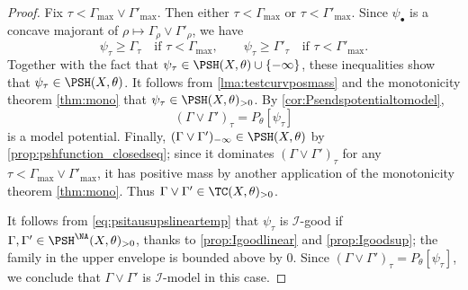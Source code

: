 \begin{proof}
    Fix $\tau<\Gamma_{\max}\lor \Gamma'_{\max}$. Then either $\tau<\Gamma_{\max}$ or $\tau<\Gamma'_{\max}$. Since $\psi_\bullet$ is a concave majorant of $\rho\mapsto\Gamma_\rho\lor\Gamma'_\rho$, we have
    \[
    \psi_\tau\geq \Gamma_\tau
    \quad\text{if } \tau<\Gamma_{\max},
    \qquad
    \psi_\tau\geq \Gamma'_\tau
    \quad\text{if } \tau<\Gamma'_{\max}.
    \]
    Together with the fact that $\psi_\tau\in \PSH(X,\theta)\cup\{-\infty\}$, these inequalities show that $\psi_\tau\in \PSH(X,\theta)$. It follows from \cref{lma:testcurvposmass} and the monotonicity theorem \cref{thm:mono} that $\psi_\tau\in \PSH(X,\theta)_{>0}$. By \cref{cor:Psendspotentialtomodel},
    \[
        (\Gamma\lor\Gamma')_\tau=P_\theta[\psi_\tau]
    \]
    is a model potential. Finally, $(\Gamma\lor\Gamma')_{-\infty}\in \PSH(X,\theta)$ by \cref{prop:pshfunction_closedseq}; since it dominates $(\Gamma\lor\Gamma')_\tau$ for any $\tau<\Gamma_{\max}\lor\Gamma'_{\max}$, it has positive mass by another application of the monotonicity theorem \cref{thm:mono}. Thus $\Gamma\lor\Gamma'\in\TC(X,\theta)_{>0}$.

    It follows from \eqref{eq:psitausupslineartemp} that $\psi_{\tau}$ is $\mathcal{I}$-good if $\Gamma,\Gamma'\in \PSH^{\NA}(X,\theta)_{>0}$, thanks to \cref{prop:Igoodlinear} and \cref{prop:Igoodsup}; the family in the upper envelope is bounded above by $0$.
    Since $(\Gamma\lor\Gamma')_\tau=P_\theta[\psi_\tau]$, we conclude that $\Gamma\lor\Gamma'$ is $\mathcal{I}$-model in this case.
\end{proof}


